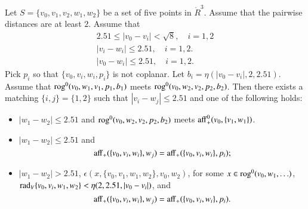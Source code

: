 \begin{lemma}
Let $S=\{v_0,v_1,v_2,w_1,w_2\}$ be a set of five points in $\ring{R}^3$.
Assume that the pairwise distances are at least $2$.  Assume
that 
  $$\begin{array}{lll}
  2.51 \le |v_0-v_i| < \sqrt8,\quad i=1,2\\
  |v_i-w_i|\le 2.51, \quad i=1,2.\\
  |v_0-w_i|\le 2.51,\quad i=1,2.
  \end{array}
  $$
Pick $p_i$ so that $\{v_0,v_i,w_i,p_i\}$ is not coplanar.
Let $b_i=\eta(|v_0-v_i|,2,2.51)$.  
%
Assume that ${\operatorname{rog}}^0(v_0,w_1,v_1,p_1,b_1)$ meets
  ${\operatorname{rog}}^0(v_0,w_2,v_2,p_2,b_2)$.
Then there exists a matching $\{i,j\}=\{1,2\}$ 
such that $|v_i-w_j|\le 2.51$ and one of the following holds:
\begin{itemize}
     \item $|w_1-w_2|\le 2.51$ and ${\operatorname{rog}}^0(v_0,w_2,v_2,p_2,b_2)$ meets
           ${\operatorname{aff}}_+^0(v_0,\{v_1,w_1\})$.
       \item $|w_1-w_2|\le 2.51$ and 
     $$
     {\operatorname{aff}}_+(\{v_0,v_i,w_i\},w_j) = {\operatorname{aff}}_+(\{v_0,v_i,w_i\},p_i);
     $$
              \item $|w_1-w_2|> 2.51$, $\epsilon(x,\{v_0,v_1,w_1,w_2\},v_0,w_2)$,
                for some $x\in {\operatorname{rog}}^0(v_0,w_1,\ldots)$, 
             $\operatorname{rad}_V\{v_0,v_i,w_1,w_2\}<\eta(2,2.51,|v_0-v_i|)$, and
    $$
     {\operatorname{aff}}_+(\{v_0,v_i,w_i\},w_j) = {\operatorname{aff}}_+(\{v_0,v_i,w_i\},p_i).
     $$
\end{itemize}
\end{lemma}

